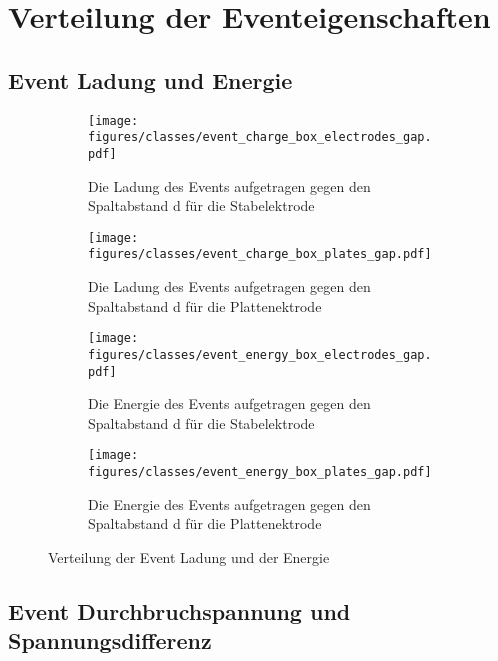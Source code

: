\section{Verteilung der Eventeigenschaften}
\label{sec:event_value_distribution}

\subsection{Event Ladung und Energie}
\label{sec:event_charge_energie}

\begin{figure}[H]
  \centering
  \begin{subfigure}[t]{0.48\textwidth}
    \centering
    \texttt{[image: figures/classes/event\_charge\_box\_electrodes\_gap.pdf]}
    \caption{Die Ladung des Events aufgetragen gegen den Spaltabstand d für die Stabelektrode}
    \label{fig:box-gap-eventcharge-stab}
  \end{subfigure}
  \begin{subfigure}[t]{0.48\textwidth}
    \centering
    \texttt{[image: figures/classes/event\_charge\_box\_plates\_gap.pdf]}
    \caption{Die Ladung des Events aufgetragen gegen den Spaltabstand d für die Plattenektrode}
    \label{fig:box-gap-event-charge-plate}
  \end{subfigure}
  \centering
  \begin{subfigure}[t]{0.48\textwidth}
    \centering
    \texttt{[image: figures/classes/event\_energy\_box\_electrodes\_gap.pdf]}
    \caption{Die Energie des Events aufgetragen gegen den Spaltabstand d für die Stabelektrode}
    \label{fig:box-gap-event-energy-stab}
  \end{subfigure}
  \begin{subfigure}[t]{0.48\textwidth}
    \centering
    \texttt{[image: figures/classes/event\_energy\_box\_plates\_gap.pdf]}
    \caption{Die Energie des Events aufgetragen gegen den Spaltabstand d für die Plattenektrode}
    \label{fig:box-gap-event-energy-plate}
  \end{subfigure}
  \caption{Verteilung der Event Ladung und der Energie}
  \label{fig:box-gap-event-charge-energy}
\end{figure}

\subsection{Event Durchbruchspannung und Spannungsdifferenz}

